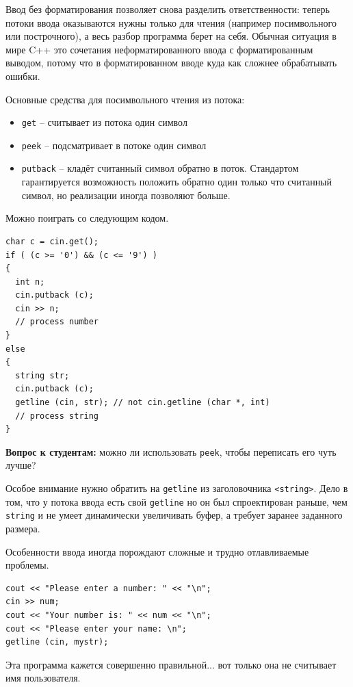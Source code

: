\documentclass[a4paper,12pt,oneside]{article}
\newif\ifanswers
\begin{document}
Ввод без форматирования позволяет снова разделить ответственности: теперь потоки ввода оказываются нужны только для чтения (например посимвольного или построчного), а весь разбор программа берет на себя. Обычная ситуация в мире C++ это сочетания неформатированного ввода с форматированным выводом, потому что в форматированном вводе куда как сложнее обрабатывать ошибки.

Основные средства для посимвольного чтения из потока: 

\begin{itemize}
\item \lstinline!get! -- считывает из потока один символ 
\item \lstinline!peek! -- подсматривает в потоке один символ 
\item \lstinline!putback! -- кладёт считанный символ обратно в поток. Стандартом гарантируется возможность положить обратно один только что считанный символ, но реализации иногда позволяют больше.
\end{itemize}

Можно поиграть со следующим кодом.

\begin{lstlisting}
char c = cin.get();
if ( (c >= '0') && (c <= '9') ) 
{
  int n;
  cin.putback (c);
  cin >> n;
  // process number
} 
else 
{
  string str;
  cin.putback (c);
  getline (cin, str); // not cin.getline (char *, int)
  // process string
}
\end{lstlisting}

\textbf{Вопрос к студентам:} можно ли использовать \lstinline!peek!, чтобы переписать его чуть лучше?

\ifanswers
Правильный ответ:  да, конечно, тогда и \lstinline!putback! можно убрать.
\fi

Особое внимание нужно обратить на \lstinline!getline! из заголовочника \lstinline!<string>!. Дело в том, что у потока ввода есть свой \lstinline!getline! но он был спроектирован раньше, чем \lstinline!string! и не умеет динамически увеличивать буфер, а требует заранее заданного размера.

Особенности ввода иногда порождают сложные и трудно отлавливаемые проблемы.

\begin{lstlisting}
cout << "Please enter a number: " << "\n";
cin >> num;
cout << "Your number is: " << num << "\n";
cout << "Please enter your name: \n";
getline (cin, mystr);
\end{lstlisting}

Эта программа кажется совершенно правильной... вот только она не считывает имя пользователя.
\end{document}
